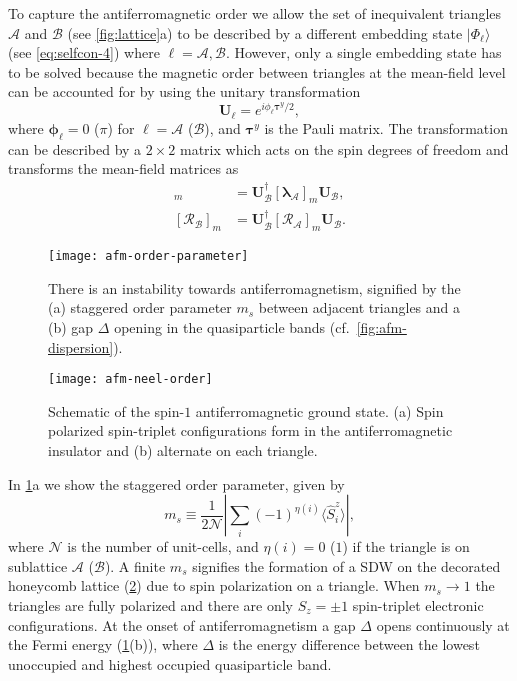 \documentclass[reprint,aps,prb,amsmath,amssymb]{revtex4-2}
\begin{document}
To capture the antiferromagnetic order we allow the set of inequivalent triangles $\mathcal{A}$ and $\mathcal{B}$ (see \cref{fig:lattice}a) to be described by a different embedding state $|\Phi_{\ell}\rangle$ (see \cref{eq:selfcon-4}) where $\ell = \mathcal{A}, \mathcal{B}$. However, only a single embedding state has to be solved because the magnetic order between triangles at the mean-field level can be accounted for by using the unitary transformation
%
\begin{equation}
\bm{U}_{\ell} = e^{i\phi_{\ell} \bm{\tau}^y/2},
\end{equation}
%
where $\bm{\phi}_{\ell} = 0$ ($\pi$) for $\ell = \mathcal{A}$ ($\mathcal{B}$), and $\bm{\tau}^y$ is the Pauli matrix. The transformation can be described by a $2\times2$ matrix which acts on the spin degrees of freedom and transforms the mean-field matrices as
%
\begin{align}
[\bm{\lambda}_{\mathcal{B}}]_{m} & = \bm{U}_{\mathcal{B}}^{\dagger} [\bm{\lambda}_{\mathcal{A}}]_{m} \bm{U}_{\mathcal{B}}^{}, \nonumber \\
%
[\bm{\mathcal{R}}_{\mathcal{B}}]_{m} & = \bm{U}_{\mathcal{B}}^{\dagger} [\bm{\mathcal{R}}_{\mathcal{A}}]_{m} \bm{U}_{\mathcal{B}}^{}.
\end{align}

\begin{figure}
	\centering
	\texttt{[image: afm-order-parameter]}
	\caption{\label{fig:afm-order-parameter}
		There is an instability towards antiferromagnetism, signified by the
		(a) staggered order parameter $m_s$ between adjacent triangles and a
		(b) gap $\Delta$ opening in the quasiparticle bands (cf.~\cref{fig:afm-dispersion}).
	}
\end{figure}

\begin{figure}
	\centering
	\texttt{[image: afm-neel-order]}
	\caption{\label{fig:afm-neel-order}
		Schematic of the spin-$1$ antiferromagnetic ground state.
		(a) Spin polarized spin-triplet configurations form in the antiferromagnetic insulator
		and (b) alternate on each triangle.
	}
\end{figure}

In \cref{fig:afm-order-parameter}a we show the staggered order parameter, given by \begin{equation}
	m_s \equiv \frac{1}{2 \mathcal{N}} \left| \sum_{i} (-1)^{\eta(i)} \langle \hat{S}_i^{z} \rangle \right|,
\end{equation}
%
where $\mathcal{N}$ is the number of unit-cells, and $\eta(i) = 0$ ($1$) if the triangle is on sublattice $\mathcal{A}$ ($\mathcal{B}$). A finite $m_s$ signifies the formation of a SDW on the decorated honeycomb lattice (\cref{fig:afm-neel-order}) due to spin polarization on a triangle. When $m_s \rightarrow 1$ the triangles are fully polarized and there are only $S_z = \pm 1$ spin-triplet electronic configurations. At the onset of antiferromagnetism a gap $\Delta$ opens continuously at the Fermi energy (\cref{fig:afm-order-parameter}(b)), where $\Delta$ is the energy difference between the lowest unoccupied and highest occupied quasiparticle band.
\end{document}
